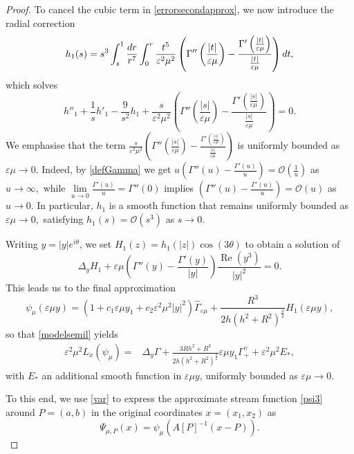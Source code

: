 \documentclass[10pt,a4paper]{amsart}
\newcommand{\ve}{\varepsilon}
\begin{document}
\begin{proof}
To cancel the cubic term in \eqref{errorsecondapprox}, we now introduce the radial correction
\[
h_{1}(s)
= s^3\int_s^1\frac{\rm dr}{r^7}
\int_0^r \frac{t^5}{\ve^2\mu^2}\left(\Gamma''\left(\frac{|t|}{\ve\mu}\right) -\frac{\Gamma'\left(\frac{|t|}{\ve\mu}\right)}{\frac{|t|}{\ve\mu}}\right) \rm d t,
\]
which solves
\[h''_{1}+\frac{1}{s} h'_{1}-\frac{9}{s^2}h_{1} +\frac{s}{\ve^2\mu^2}\left(\Gamma''\left(\frac{|s|}{\ve\mu}\right)-\frac{\Gamma'\left(\frac{|s|}{\ve\mu}\right)}{\frac{|s|}{\ve\mu}}\right)=0.\]
We emphasise that the term $\frac{s}{\ve^2\mu^2}\left(\Gamma''\left(\frac{|s|}{\ve\mu}\right)-\frac{\Gamma'\left(\frac{|s|}{\ve\mu}\right)}{\frac{|s|}{\ve\mu}}\right)$ is uniformly bounded as $\ve\mu\to 0$.
Indeed, by \eqref{defGamma} we get $u\left(\Gamma''(u)-\frac{\Gamma'(u)}{u}\right)=\mathcal{O}\left(\frac{1}{u}\right)$ as $u \to \infty,$ while $\lim\limits_{u\to 0}\frac{\Gamma'(u)}{u}=\Gamma''(0)$ implies $\left(\Gamma''(u)-\frac{\Gamma'(u)}{u}\right)=\mathcal{O}(u)$ as $u \to 0.$ In particular, $h_{1}$ is a smooth function that remains uniformly bounded as $\ve\mu \to 0,$ satisfying $h_{1}(s)=\mathcal{O}(s^3)$ as $s\to 0$. 

Writing $y=|y|e^{i\theta}$, we set $H_{1}(z)=h_{1}(|z|)\cos(3\theta)$ to obtain a solution of
\begin{equation*}
\Delta_{y} H_{1}+\ve\mu\left(\Gamma''(y) -\frac{\Gamma'(y)}{|y|}\right)\frac{\operatorname{Re}(y^3)}{|y|^2} =0.
\end{equation*}
This leads us to the final approximation 
\begin{equation}\label{psi3}
\psi_{\mu}(\ve\mu y)=\left(1+c_1\ve \mu y_1+c_2\ve^2\mu^2|y|^2\right)\widehat\Gamma_{\ve\mu}
+\frac{R^3}{2h(h^2+R^2)^{\frac{3}{2}}}H_{1}(\ve\mu y),
\end{equation}
so that \eqref{modelsemil} yields
\begin{equation*}
\begin{aligned}
\ve^2 \mu^2 L_{x}\left(\psi_{\mu}\right)= &\Delta_y\Gamma
+\frac{3Rh^2+R^3}{2h(h^2+R^2)^\frac{3}{2}}
 \ve\mu y_1 \Gamma_{+}^{\gamma}
 +\ve^2\mu^2 E_{*},
\end{aligned}
\end{equation*}
with $E_{*}$ an additional smooth function in $\ve\mu y$, uniformly bounded as $\ve\mu \to 0$. 

To this end, we use \eqref{var} to express the approximate stream function \eqref{psi3} around $P=(a,b)$ in the original coordinates $x=(x_1,x_2)$ as
\begin{equation*}
\Psi_{\mu,P}(x)=\psi_{\mu}\left(A[P]^{-1}(x-P)\right).
\end{equation*}
\end{proof}
\end{document}
